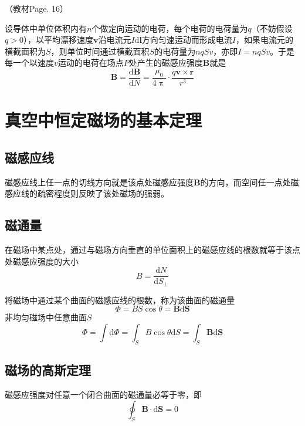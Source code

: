 \documentclass[
	12pt, %
	a4paper, %
]{myLegrandOrangeBook}
\newcommand{\rmd}{\mathrm{d}}
\newcommand{\deriv}[2]{\frac{\rmd #1}{\rmd #2}}
\begin{document}
（教材Page. 16）

设导体中单位体积内有\(n\)个做定向运动的电荷，每个电荷的电荷量为\(q\)（不妨假设\(q > 0\)），以平均漂移速度\(\mathbf{v}\)沿电流元\(I \rmd \mathbf{l}\)方向匀速运动而形成电流\(I\)，如果电流元的横截面积为\(S\)，则单位时间通过横截面积\(S\)的电荷量为\(nqSv\)，亦即\(I = nqSv\)。于是每一个以速度\(v\)运动的电荷在场点\(P\)处产生的磁感应强度\(\mathbf{B}\)就是
\begin{equation}
    \mathbf{B} = \deriv{\mathbf{B}}{N} = \frac{\mu_0}{4 \uppi} \cdot \frac{q \mathbf{v} \times \mathbf{r}}{r^3}
\end{equation}

\section{真空中恒定磁场的基本定理}

\subsection{磁感应线}

磁感应线上任一点的切线方向就是该点处磁感应强度\(\mathbf{B}\)的方向，而空间任一点处磁感应线的疏密程度则反映了该处磁场的强弱。

\subsection{磁通量}

在磁场中某点处，通过与磁场方向垂直的单位面积上的磁感应线的根数就等于该点处磁感应强度的大小
\begin{equation}
    B = \deriv{N}{S_{\perp}}
\end{equation}

将磁场中通过某个曲面的磁感应线的根数，称为该曲面的磁通量
\begin{equation}
    \Phi = BS \cos \theta = \mathbf{B} \rmd \mathbf{S}
\end{equation}
非均匀磁场中任意曲面\(S\)
\begin{equation}
    \Phi = \int \rmd \Phi = \int_S B \cos \theta \rmd S = \int_S \mathbf{B} \rmd \mathbf{S}
\end{equation}

\subsection{磁场的高斯定理}

\begin{theorem}[磁场的高斯定理]
磁感应强度对任意一个闭合曲面的磁通量必等于零，即
\begin{equation}
    \oint_S \mathbf{B} \cdot \rmd \mathbf{S} = 0
\end{equation}
\end{theorem}
\end{document}

